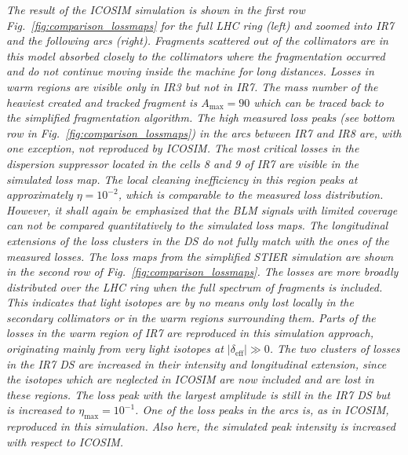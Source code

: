 \textit{The result of the ICOSIM simulation is shown in the first row Fig.~\ref{fig:comparison_lossmaps} for the full LHC ring (left) and zoomed into IR7 and the following arcs (right). Fragments scattered out of the collimators are in this model absorbed closely to the collimators where the fragmentation occurred and do not continue moving inside the machine for long distances. Losses in warm regions are visible only in IR3 but not in IR7. The mass number of the heaviest created and tracked fragment is $A_\text{max} = 90$ which can be traced back to the simplified fragmentation algorithm. The high measured loss peaks (see bottom row in Fig.~\ref{fig:comparison_lossmaps}) in the arcs between IR7 and IR8 are, with one exception, not reproduced by ICOSIM. The most critical losses in the dispersion suppressor located in the cells 8 and 9 of IR7 are visible in the simulated loss map. The local cleaning inefficiency in this region peaks at approximately $\eta=10^{-2}$, which is comparable to the measured loss distribution. However, it shall again be emphasized that the BLM signals with limited coverage can not be compared quantitatively to the simulated loss maps. The longitudinal extensions of the loss clusters in the DS do not fully match with the ones of the measured losses. 
%
%
The loss maps from the simplified STIER simulation are shown in the second row of Fig.~\ref{fig:comparison_lossmaps}. The losses are more broadly distributed over the LHC ring when the full spectrum of fragments is included. This indicates that light isotopes are by no means only lost locally in the secondary collimators or in the warm regions surrounding them. Parts of the losses in the warm region of IR7 are reproduced in this simulation approach, originating mainly from very light isotopes at $|\delta_\text{eff}|\gg0$. The two clusters of losses in the IR7 DS are increased in their intensity and longitudinal extension, since the isotopes which are neglected in ICOSIM are now included and are lost in these regions. The loss peak with the largest amplitude is still in the IR7 DS but is increased to \mbox{$\eta_\text{max} = 10^{-1}$}. One of the loss peaks in the arcs is, as in ICOSIM, reproduced in this simulation. Also here, the simulated peak intensity is increased with respect to ICOSIM.}




